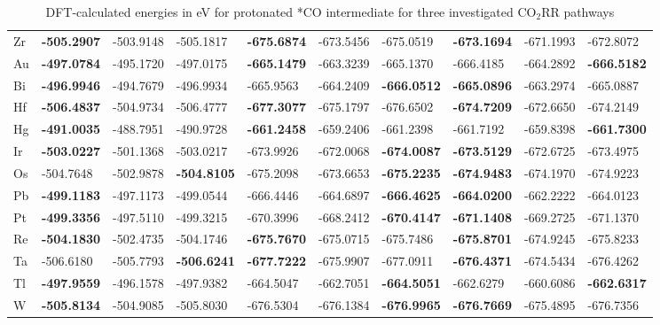 \begin{table}[h]
{\begin{tabular}{*{10}{l}}
      Zr & \textbf{-505.2907} & -503.9148 & -505.1817 & \textbf{-675.6874} & -673.5456 & -675.0519 & \textbf{-673.1694} & -671.1993 & -672.8072 \\
      Au & \textbf{-497.0784} & -495.1720 & -497.0175 & \textbf{-665.1479} & -663.3239 & -665.1370 & -666.4185 & -664.2892 & \textbf{-666.5182} \\
      Bi & \textbf{-496.9946} & -494.7679 & -496.9934 & -665.9563 & -664.2409 & \textbf{-666.0512} & \textbf{-665.0896} & -663.2974 & -665.0887 \\
      Hf & \textbf{-506.4837} & -504.9734 & -506.4777 & \textbf{-677.3077} & -675.1797 & -676.6502 & \textbf{-674.7209} & -672.6650 & -674.2149 \\
      Hg & \textbf{-491.0035} & -488.7951 & -490.9728 & \textbf{-661.2458} & -659.2406 & -661.2398 & -661.7192 & -659.8398 & \textbf{-661.7300} \\
      Ir & \textbf{-503.0227} & -501.1368 & -503.0217 & -673.9926 & -672.0068 & \textbf{-674.0087} & \textbf{-673.5129} & -672.6725 & -673.4975 \\
      Os & -504.7648 & -502.9878 & \textbf{-504.8105} & -675.2098 & -673.6653 & \textbf{-675.2235} & \textbf{-674.9483} & -674.1970 & -674.9223 \\
      Pb & \textbf{-499.1183} & -497.1173 & -499.0544 & -666.4446 & -664.6897 & \textbf{-666.4625} & \textbf{-664.0200} & -662.2222 & -664.0123 \\
      Pt & \textbf{-499.3356} & -497.5110 & -499.3215 & -670.3996 & -668.2412 & \textbf{-670.4147} & \textbf{-671.1408} & -669.2725 & -671.1370 \\
      Re & \textbf{-504.1830} & -502.4735 & -504.1746 & \textbf{-675.7670} & -675.0715 & -675.7486 & \textbf{-675.8701} & -674.9245 & -675.8233 \\
      Ta & -506.6180 & -505.7793 & \textbf{-506.6241} & \textbf{-677.7222} & -675.9907 & -677.0911 & \textbf{-676.4371} & -674.5434 & -676.4262 \\
      Tl & \textbf{-497.9559} & -496.1578 & -497.9382 & -664.5047 & -662.7051 & \textbf{-664.5051} & -662.6279 & -660.6086 & \textbf{-662.6317}\\
      W  & \textbf{-505.8134} & -504.9085 & -505.8030 & -676.5304 & -676.1384 & \textbf{-676.9965} & \textbf{-676.7669} & -675.4895 & -676.7356 \\
  \end{tabular}
  }
  \caption{DFT-calculated energies in eV for protonated *CO intermediate for three investigated CO$_2$RR pathways}
  \label{si_table1}
\end{table}


